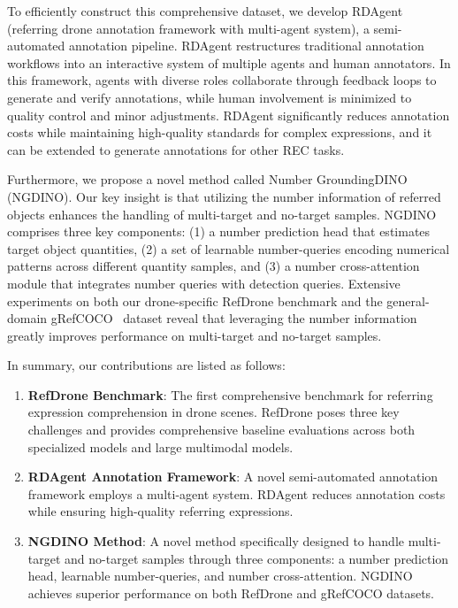 To efficiently construct this comprehensive dataset, we develop RDAgent (referring drone annotation framework with multi-agent system), a semi-automated annotation pipeline. RDAgent restructures traditional annotation workflows into an interactive system of multiple agents and human annotators. In this framework, agents with diverse roles collaborate through feedback loops to generate and verify annotations, while human involvement is minimized to quality control and minor adjustments. RDAgent significantly reduces annotation costs while maintaining high-quality standards for complex expressions, and it can be extended to generate annotations for other REC tasks.\par


Furthermore, we propose a novel method called Number GroundingDINO (NGDINO). Our key insight is that utilizing the number information of referred objects enhances the handling of multi-target and no-target samples. NGDINO comprises three key components: (1) a number prediction head that estimates target object quantities, (2) a set of learnable number-queries encoding numerical patterns across different quantity samples, and (3) a number cross-attention module that integrates number queries with detection queries. Extensive experiments on both our drone-specific RefDrone benchmark and the general-domain gRefCOCO~\cite{grefcoco} dataset reveal that leveraging the number information greatly improves performance on multi-target and no-target samples. \par


In summary, our contributions are listed as follows:
\begin{enumerate}

    \item \textbf{RefDrone Benchmark}: The first comprehensive benchmark for referring expression comprehension in drone scenes. RefDrone poses three key challenges and provides comprehensive baseline evaluations across both specialized models and large multimodal models.

    
    \item \textbf{RDAgent Annotation Framework}: A novel semi-automated annotation framework employs a multi-agent system. RDAgent reduces annotation costs while ensuring high-quality referring expressions.
        
    \item \textbf{NGDINO Method}: A novel method specifically designed to handle multi-target and no-target samples through three components: a number prediction head, learnable number-queries, and number cross-attention. NGDINO achieves superior performance on both RefDrone and gRefCOCO datasets.
    
    
\end{enumerate}


